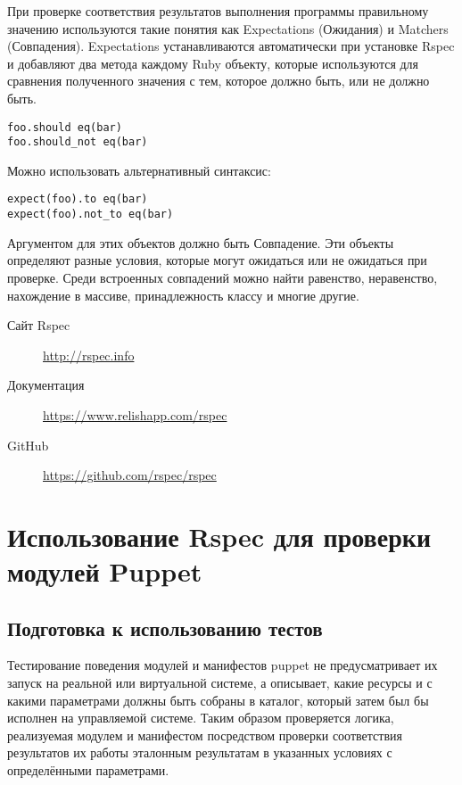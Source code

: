 При проверке соответствия результатов выполнения программы правильному значению используются такие понятия как Expectations (Ожидания) и Matchers (Совпадения). Expectations устанавливаются автоматически при установке Rspec и добавляют два метода каждому Ruby объекту, которые используются для сравнения полученного значения с тем, которое должно быть, или не должно быть.

\begin{verbatim}
foo.should eq(bar)
foo.should_not eq(bar)
\end{verbatim}

Можно использовать альтернативный синтаксис:

\begin{verbatim}
expect(foo).to eq(bar)
expect(foo).not_to eq(bar) 
\end{verbatim}

Аргументом для этих объектов должно быть Совпадение. Эти объекты определяют разные условия, которые могут ожидаться или не ожидаться при проверке. Среди встроенных совпадений можно найти равенство, неравенство, нахождение в массиве, принадлежность классу и многие другие.

\begin{description}
\item[Сайт Rspec] \url{http://rspec.info}
\item[Документация] \url{https://www.relishapp.com/rspec}
\item[GitHub] \url{https://github.com/rspec/rspec}
\end{description}


\section{Использование Rspec для проверки модулей Puppet}

\subsection{Подготовка к использованию тестов}

Тестирование поведения модулей и манифестов puppet не предусматривает их запуск на реальной или виртуальной системе, а описывает, какие ресурсы и с какими параметрами должны быть собраны в каталог, который затем был бы исполнен на управляемой системе. Таким образом проверяется логика, реализуемая модулем и манифестом посредством проверки соответствия результатов их работы эталонным результатам в указанных условиях с определёнными параметрами.

